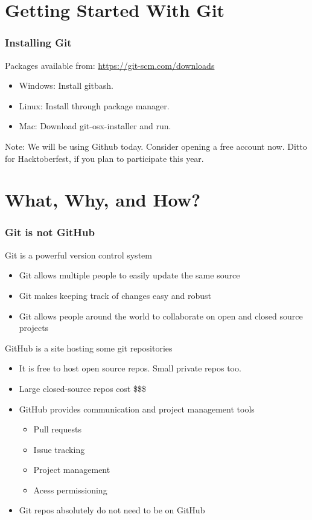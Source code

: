 \documentclass[unknownkeysallowed]{beamer}
\begin{document}
\section{Getting Started With Git}
\begin{frame}
    \frametitle{Installing Git}
    Packages available from: \url{https://git-scm.com/downloads}
    \vspace{0.5cm}
    \begin{itemize}
        \item{Windows: Install gitbash.}
        \item{Linux: Install through package manager.}
        \item{Mac: Download git-osx-installer and run. }
    \end{itemize}
    \vspace{0.5cm}
    Note: We will be using Github today. Consider opening a free account now.
    Ditto for Hacktoberfest, if you plan to participate this year.
\end{frame}


\section{What, Why, and How?}
\begin{frame}
    \frametitle{Git is not GitHub}
    \vspace{0.5cm} %
    Git is a powerful version control system
            \begin{itemize}
                \item{Git allows multiple people to easily update the same source}
                \item{Git makes keeping track of changes easy and robust}
       		\item{Git allows people around the world to collaborate on open and closed source projects}
            \end{itemize}
    \vspace{0.25cm}
    GitHub is a site hosting some git repositories
            \begin{itemize}
		\item{It is free to host open source repos. Small private repos too.}
                \item{Large closed-source repos cost \$\$\$}
        	\item{GitHub provides communication and project management tools}
	        \begin{itemize}
		    \item{Pull requests}
		    \item{Issue tracking}
		    \item{Project management}
		    \item{Acess permissioning}
		\end{itemize}
    \vspace{0.25cm}
	\item{Git repos absolutely do not need to be on GitHub}
    \end{itemize}
\end{frame}
\end{document}
